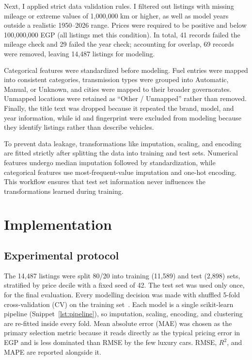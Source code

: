 Next, I applied strict data validation rules. I filtered out listings with missing mileage or extreme values of 1,000,000 km or higher, as well as model years outside a realistic 1950--2026 range. Prices were required to be positive and below 100,000,000 EGP (all listings met this condition). In total, 41 records failed the mileage check and 29 failed the year check; accounting for overlap, 69 records were removed, leaving 14,487 listings for modeling.

Categorical features were standardized before modeling. Fuel entries were mapped into consistent categories, transmission types were grouped into Automatic, Manual, or Unknown, and cities were mapped to their broader governorates. Unmapped locations were retained as ``Other / Unmapped'' rather than removed. Finally, the title text was dropped because it repeated the brand, model, and year information, while id and fingerprint were excluded from modeling because they identify listings rather than describe vehicles.

To prevent data leakage, transformations like imputation, scaling, and encoding are fitted strictly after splitting the data into training and test sets. Numerical features undergo median imputation followed by standardization, while categorical features use most-frequent-value imputation and one-hot encoding. This workflow ensures that test set information never influences the transformations learned during training.

\section{Implementation}
\subsection{Experimental protocol}
The 14,487 listings were split 80/20 into training (11,589) and test (2,898) sets, stratified by price decile with a fixed seed of 42. The test set was used only once, for the final evaluation. Every modelling decision was made with shuffled 5-fold cross-validation (CV) on the training set~\citep{kohavi1995}. Each model is a single scikit-learn~\citep{pedregosa2011} pipeline (Snippet~\ref{lst:pipeline}), so imputation, scaling, encoding, and clustering are re-fitted inside every fold. Mean absolute error (MAE) was chosen as the primary selection metric because it reads directly as the typical pricing error in EGP and is less dominated than RMSE by the few luxury cars. RMSE, $R^2$, and MAPE are reported alongside it.

